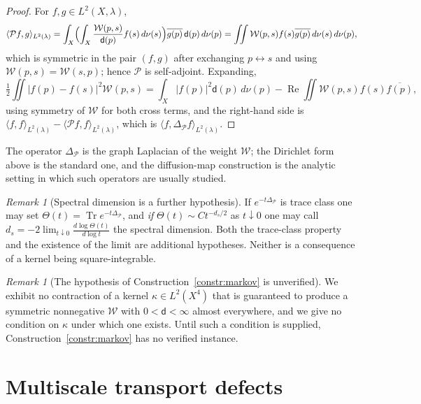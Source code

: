 \documentclass[11pt]{amsart}
\theoremstyle{definition}
\theoremstyle{remark}
\newtheorem{remark}[theorem]{Remark}
\newcommand{\Tr}{\operatorname{Tr}}
\begin{document}
\begin{proof}
For $f,g\in L^{2}(X,\lambda)$,
\[
 \langle\mathcal Pf,g\rangle_{L^{2}(\lambda)}
 =\int_X\Bigl(\int_X\frac{\mathcal W(p,s)}{\mathsf d(p)}f(s)\,d\nu(s)\Bigr)
 \overline{g(p)}\,\mathsf d(p)\,d\nu(p)
 =\iint \mathcal W(p,s)f(s)\overline{g(p)}\,d\nu(s)\,d\nu(p),
\]
which is symmetric in the pair $(f,g)$ after exchanging $p\leftrightarrow s$ and using
$\mathcal W(p,s)=\mathcal W(s,p)$; hence $\mathcal P$ is self-adjoint. Expanding,
\[
 \tfrac12\iint\lvert f(p)-f(s)\rvert^{2}\mathcal W(p,s)
 =\int_X\lvert f(p)\rvert^{2}\mathsf d(p)\,d\nu(p)
 -\operatorname{Re}\iint\mathcal W(p,s)f(s)\overline{f(p)},
\]
using symmetry of $\mathcal W$ for both cross terms, and the right-hand side is
$\langle f,f\rangle_{L^{2}(\lambda)}-\langle\mathcal Pf,f\rangle_{L^{2}(\lambda)}$, which
is $\langle f,\Delta_{\mathcal P}f\rangle_{L^{2}(\lambda)}$.
\end{proof}

The operator $\Delta_{\mathcal P}$ is the graph Laplacian of the weight $\mathcal W$; the
Dirichlet form above is the standard one, and the diffusion-map construction
\cite{CoifmanLafon2006} is the analytic setting in which such operators are usually
studied.

\begin{remark}[Spectral dimension is a further hypothesis]
\label{rem:spectraldim}
If $e^{-t\Delta_{\mathcal P}}$ is trace class one may set $\Theta(t)=\Tr
e^{-t\Delta_{\mathcal P}}$, and \emph{if} $\Theta(t)\sim Ct^{-d_s/2}$ as $t\downarrow0$ one
may call $d_s=-2\lim_{t\downarrow0}\frac{d\log\Theta(t)}{d\log t}$ the spectral dimension.
Both the trace-class property and the existence of the limit are additional hypotheses.
Neither is a consequence of a kernel being square-integrable.
\end{remark}

\begin{remark}[The hypothesis of Construction~\ref{constr:markov} is unverified]
\label{rem:markovunverified}
We exhibit no contraction of a kernel $\kappa\in L^{2}(X^{4})$ that is guaranteed to
produce a symmetric nonnegative $\mathcal W$ with $0<\mathsf d<\infty$ almost everywhere,
and we give no condition on $\kappa$ under which one exists. Until such a condition is
supplied, Construction~\ref{constr:markov} has no verified instance.
\end{remark}

\section{Multiscale transport defects}
\label{sec:multiscale}
\end{document}
